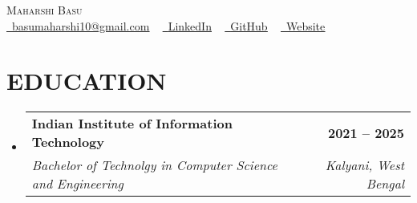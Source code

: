 \documentclass[letterpaper,11pt]{article}
\makeatletter
\newcommand{\resumeSubheading}[4]{
  \vspace{-2pt}\item
    \begin{tabular*}{1.0\textwidth}[t]{l@{\extracolsep{\fill}}r}
      \textbf{#1} & \textbf{\small #2} \\
      \textit{\small#3} & \textit{\small #4} \\
    \end{tabular*}\vspace{-7pt}
}
\newcommand{\resumeSubHeadingListStart}{\begin{itemize}[leftmargin=0.0in, label={}]}
\newcommand{\resumeSubHeadingListEnd}{\end{itemize}}
\makeatother
\begin{document}
\begin{center}
    {\Huge \scshape Maharshi Basu} \\ \vspace{4pt}
     \href{mailto:basumaharshi10@gmail.com}{\raisebox{-0.2\height}\faEnvelope\  \underline{basumaharshi10@gmail.com}} ~ 
    \href{https://www.linkedin.com/in/basum10/}{\raisebox{-0.2\height}\faLinkedin\ \underline{LinkedIn}}  ~
    \href{https://github.com/MashyBasker}{\raisebox{-0.2\height}\faGithub\ \underline{GitHub}} ~
    \href{https://mashybasker.github.io}{\raisebox{-0.2\height}
    \faGlobe\ \underline{Website}}
    
    \vspace{-8pt}
\end{center}
\section{EDUCATION}
  \resumeSubHeadingListStart
    \resumeSubheading
      {Indian Institute of Information Technology}{2021 -- 2025}
      {Bachelor of Technolgy in Computer Science and Engineering}{Kalyani, West Bengal}
 \resumeSubHeadingListEnd
\end{document}
